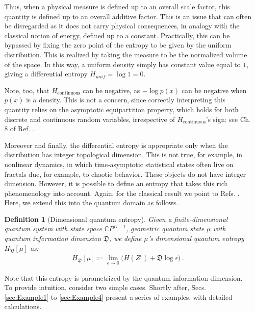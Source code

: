 \documentclass[draft,nofootinbib,pre,twocolumn,showkeys,superscriptaddress,preprintnumbers,floatfix]{revtex4-1}
\newcommand{\1}{\mathbbm{1}}
\newcommand{\CP}[1]{\mathbb{C}P^{#1}}
\newtheorem{Definition}{Definition}
\begin{document}
Thus, when a physical measure is defined up to an overall scale factor, this
quantity is defined up to an overall additive factor. This is an issue that can
often be disregarded as it does not carry physical consequences, in analogy
with the classical notion of energy, defined up to a constant. Practically,
this can be bypassed by fixing the zero point of the entropy to be given by the
uniform distribution. This is realized by taking the measure to be the
normalized volume of the space. In this way, a uniform density simply has
constant value equal to $1$, giving a differential entropy $H_{unif} = \log 1
=0$.

Note, too, that $H_{\mathrm{continuous}}$ can be negative, as $-\log p(x)$ can
be negative when $p(x)$ is a density. This is not a concern, since correctly
interpreting this quantity relies on the asymptotic equipartition property,
which holds for both discrete and continuous random variables, irrespective of
$H_{\mathrm{continuous}}$'s sign; see Ch. 8 of Ref. \cite{Cove91a}.

Moreover and finally, the differential entropy is appropriate only when the
distribution has integer topological dimension. This is not true, for example,
in nonlinear dynamics, in which time-asymptotic statistical states often live
on fractals due, for example, to chaotic behavior. These objects do not have
integer dimension. However, it is possible to define an entropy that takes this
rich phenomenology into account. Again, for the classical result we point to
Refs. \cite{Renyi59,Wu10}. Here, we extend this into the quantum domain as
follows.

\begin{Definition}[Dimensional quantum entropy]
Given a finite-dimensional quantum system with state space $\CP{D-1}$, geometric
quantum state $\mu$ with quantum information dimension $\mathfrak{D}$, we define
$\mu$'s dimensional quantum entropy $H_{\mathfrak{D}}\left[\mu\right]$ as:
\begin{align}
H_{\mathfrak{D}}\left[\mu\right] \coloneqq \lim_{\epsilon \to 0}
	\big( H\left(Z^\epsilon\right) + \mathfrak{D} \log \epsilon\big)
  ~.
\label{eq:GDQE}
\end{align}
\end{Definition}

Note that this entropy is parametrized by the quantum information dimension. To
provide intuition, consider two simple cases. Shortly after, Secs. \ref{sec:Example1} 
to \ref{sec:Example4} present a series of examples, with detailed calculations.
\end{document}
